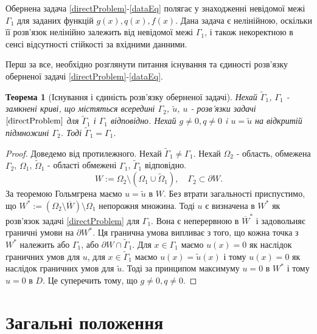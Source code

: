 \documentclass[12pt]{report}
\newtheorem{theorem}{Теорема}
\begin{document}
Обернена задача \eqref{directProblem}-\eqref{dataEq} полягає у знаходженні невідомої межі $\Gamma_1$ для заданих функцій $g(x), q(x), f(x)$. Дана задача є нелінійною, оскільки її розв'язок нелінійно залежить від невідомої межі $\Gamma_1$, і також некоректною в сенсі відсутності стійкості за вхідними данними.

Перш за все, необхідно розглянути питання існування та єдиності розв'язку оберненої задачі \eqref{directProblem}-\eqref{dataEq}.

\begin{theorem}[Існування і єдиність розв'язку оберненої задачі]

Нехай $\tilde{\Gamma}_1$, $\Gamma_1$ - замкнені криві, що містяться всередині $\Gamma_2$, $\tilde{u}$, $u$ - розв'язки задачі $\eqref{directProblem}$ для $\tilde{\Gamma}_1$ і $\Gamma_1$ відповідно. Нехай $g\neq 0, q\neq 0$ i $u = \tilde{u}$ на відкритій підмножині $\Gamma_2$. Тоді $\tilde{\Gamma}_1=\Gamma_1$.

\end{theorem}

\begin{proof}

Доведемо від протилежного. Нехай $\tilde{\Gamma}_1\neq\Gamma_1$.
Нехай $\Omega_2$ - область, обмежена $\Gamma_2$, $\Omega_1$, $\tilde{\Omega}_1$ - області обмежені $\Gamma_1$, $\tilde{\Gamma}_1$ відповідно. 
\begin{equation}
W:=\Omega_2\setminus(\Omega_1\cup\tilde{\Omega}_1), \quad \Gamma_2\subset\partial W. \nonumber
\end{equation}
За теоремою Гольмгрена \cite{Holmgren} маємо $u = \tilde{u}$ в $W$. Без втрати загальності приспустимо, що $W^{*}:=(\Omega_2\setminus \overline{W})\setminus\Omega_1$ непорожня множина. Тоді $u$ є визначена в $W^{*}$ як розв'язок задачі \eqref{directProblem} для $\Gamma_1$. Вона є неперервною в $\overline{W}^{*}$ і задовольняє граничні умови на $\partial W^{*}$. Ця гранична умова випливає з того, що кожна точка з $W^{*}$ належить або $\Gamma_1$, або $\partial W\cap\tilde{\Gamma}_1$. Для $x\in\Gamma_1$ маємо $u(x)=0$ як наслідок граничних умов для $u$, для $x\in\tilde{\Gamma}_1$ маємо $u(x)=\tilde{u}(x)$ і тому $u(x)=0$ як наслідок граничних умов для $\tilde{u}$. Тоді за принципом максимуму $u=0$ в $W^{*}$ і тому $u=0$ в $D$. Це суперечить тому, що $g\neq 0, q\neq 0$.

\end{proof}


\setcounter{secnumdepth}{1}
\chapter{Загальні положення}
\label{chapter1}
\end{document}
